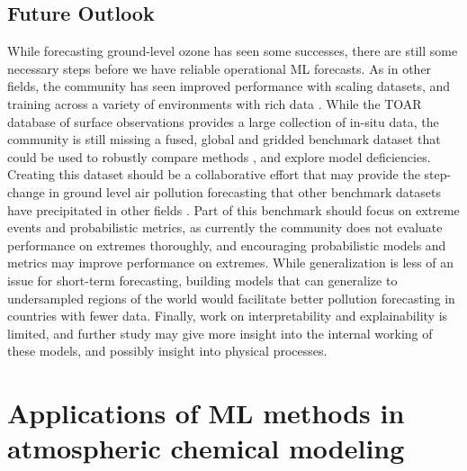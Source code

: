 \documentclass[gmd, manuscript]{copernicus}
\begin{document}
\subsection{Future Outlook}
While forecasting ground-level ozone has seen some successes, there are still some necessary steps before we have reliable operational ML forecasts. As in other fields, the community has seen improved performance with scaling datasets, and training across a variety of environments with rich data \citep{leufen_o3resnet_2023}. While the TOAR database of surface observations provides a large collection of in-situ data, the community is still missing a fused, global and gridded benchmark dataset that could be used to robustly compare methods \citep{Dueben2022, Rasp2024}, and explore model deficiencies. Creating this dataset should be a collaborative effort that may provide the step-change in ground level air pollution forecasting that other benchmark datasets have precipitated in other fields \citep{Deng2009}. Part of this benchmark should focus on extreme events and probabilistic metrics, as currently the community does not evaluate performance on extremes thoroughly, and encouraging probabilistic models and metrics may improve performance on extremes. While generalization is less of an issue for short-term forecasting, building models that can generalize to undersampled regions of the world would facilitate better pollution forecasting in countries with fewer data. Finally, work on interpretability and explainability is limited, and further study may give more insight into the internal working of these models, and possibly insight into physical processes.


\section{Applications of ML methods in atmospheric chemical modeling}
\end{document}
